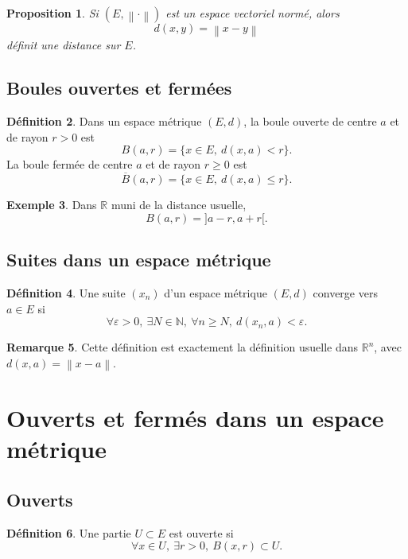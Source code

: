 \documentclass[11pt,a4paper]{article}
\theoremstyle{definition}
\newtheorem{definition}{Définition}[section]
\newtheorem{exemple}[definition]{Exemple}
\newtheorem{remarque}[definition]{Remarque}
\theoremstyle{plain}
\newtheorem{proposition}[definition]{Proposition}
\newcommand{\R}{\mathbb{R}}
\newcommand{\N}{\mathbb{N}}
\newcommand{\eps}{\varepsilon}
\newcommand{\norme}[1]{\left\lVert #1 \right\rVert}
\begin{document}
\begin{proposition}
Si $(E,\norme{\cdot})$ est un espace vectoriel normé, alors
\[
d(x,y)=\norme{x-y}
\]
définit une distance sur $E$.
\end{proposition}

\subsection{Boules ouvertes et fermées}

\begin{definition}
Dans un espace métrique $(E,d)$, la boule ouverte de centre $a$ et de rayon $r>0$ est
\[
B(a,r)=\{x\in E,\ d(x,a)<r\}.
\]
La boule fermée de centre $a$ et de rayon $r\geq 0$ est
\[
\overline B(a,r)=\{x\in E,\ d(x,a)\leq r\}.
\]
\end{definition}

\begin{exemple}
Dans $\R$ muni de la distance usuelle,
\[
B(a,r)=]a-r,a+r[.
\]
\end{exemple}

\subsection{Suites dans un espace métrique}

\begin{definition}
Une suite $(x_n)$ d'un espace métrique $(E,d)$ converge vers $a\in E$ si
\[
\forall \eps>0,\ \exists N\in\N,\ \forall n\geq N,\ d(x_n,a)<\eps.
\]
\end{definition}

\begin{remarque}
Cette définition est exactement la définition usuelle dans $\R^n$, avec $d(x,a)=\norme{x-a}$.
\end{remarque}

\section{Ouverts et fermés dans un espace métrique}

\subsection{Ouverts}

\begin{definition}
Une partie $U\subset E$ est ouverte si
\[
\forall x\in U,\ \exists r>0,\ B(x,r)\subset U.
\]
\end{definition}
\end{document}
